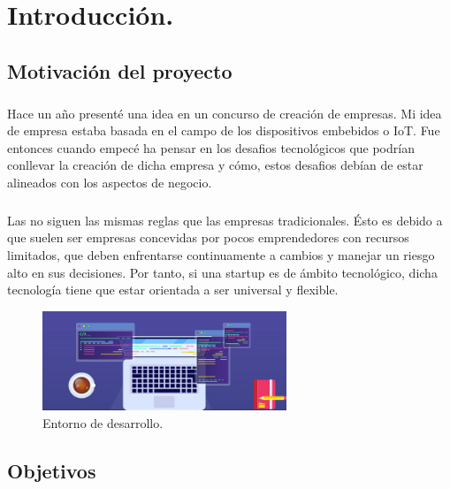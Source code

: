 \chapter{Introducción.}\label{sec:introduccion}



\section{Motivación del proyecto}

\paragraph{}Hace un año presenté una idea en un concurso de creación de empresas. Mi
idea de empresa estaba basada en el campo de los dispositivos embebidos o IoT. Fue
entonces cuando empecé ha pensar en los desafios tecnológicos que podrían conllevar la
creación de dicha empresa y cómo, estos desafios debían de estar alineados con los
aspectos de negocio.

\paragraph{}Las  no siguen las mismas reglas que las empresas tradicionales.
Ésto es debido a que suelen ser empresas concevidas por pocos emprendedores con recursos
limitados, que deben enfrentarse continuamente a cambios y manejar un riesgo alto en
sus decisiones. Por tanto, si una \gls{startup} es de ámbito tecnológico, dicha tecnología tiene
que estar orientada a ser universal y flexible.

\hfill \break

\begin{figure}[ht]
    \centering
    \includegraphics[width=0.65\textwidth]{imgs/dev-env.jpg}
    \caption{Entorno de desarrollo.}
    \label{fig:dev-env}
\end{figure}

\hfill \break

\section{Objetivos}

